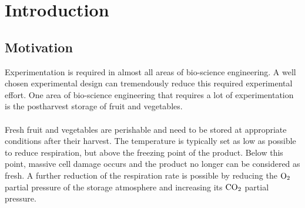 \chapter{Introduction}
\section{Motivation}
{\color{red}Experimentation is required in almost all areas of bio-science engineering. A well chosen experimental design can tremendously reduce this required experimental effort. One area of bio-science engineering that requires a lot of experimentation is the postharvest storage of fruit and vegetables.}
\\
\\
Fresh fruit and vegetables are perishable and need to be stored at appropriate conditions after their harvest. The temperature is typically set as low as possible to reduce respiration, but above the freezing point of the product. Below this point, massive cell damage occurs and the product no longer can be considered as fresh. A further reduction of the respiration rate is possible by reducing the $\text{O}_2$ partial pressure of the storage atmosphere and increasing its $\text{CO}_2$
partial pressure. 

